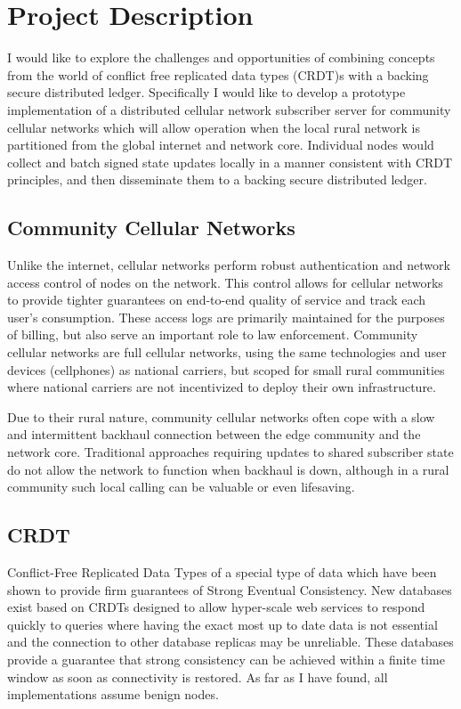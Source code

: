 \section{Project Description}

I would like to explore the challenges and opportunities of combining
concepts from the world of conflict free replicated data types (CRDT)s
with a backing secure distributed ledger. Specifically I would like to
develop a prototype implementation of a distributed cellular network
subscriber server for community cellular networks which will allow
operation when the local rural network is partitioned from the global
internet and network core. Individual nodes would collect and batch
signed state updates locally in a manner consistent with CRDT
principles, and then disseminate them to a backing secure distributed
ledger.

\subsection{Community Cellular Networks} 
Unlike the internet, cellular networks perform robust authentication
and network access control of nodes on the network. This control
allows for cellular networks to provide tighter guarantees on
end-to-end quality of service and track each user's consumption. These
access logs are primarily maintained for the purposes of billing, but
also serve an important role to law enforcement. Community cellular
networks are full cellular networks, using the same technologies and
user devices (cellphones) as national carriers, but scoped for small
rural communities where national carriers are not incentivized to
deploy their own infrastructure.\cite{Heimerllongitudinalstudylocal2015}

Due to their rural nature, community cellular networks often cope with
a slow and intermittent backhaul connection between the edge community
and the network core. Traditional approaches requiring updates to
shared subscriber state do not allow the network to function when
backhaul is down, although in a rural community such local calling
can be valuable or even lifesaving.

\subsection{CRDT}
Conflict-Free Replicated Data Types of a special type of data which
have been shown to provide firm guarantees of Strong Eventual
Consistency.\cite{ShapiroConflictfreereplicateddata2011} New databases exist based on CRDTs designed to
allow hyper-scale web services to respond quickly to queries where
having the exact most up to date data is not essential and the
connection to other database replicas may be unreliable.\cite{DatanetNewCRDT16} These
databases provide a guarantee that strong consistency can be achieved
within a finite time window as soon as connectivity is restored. As
far as I have found, all implementations assume benign nodes.

